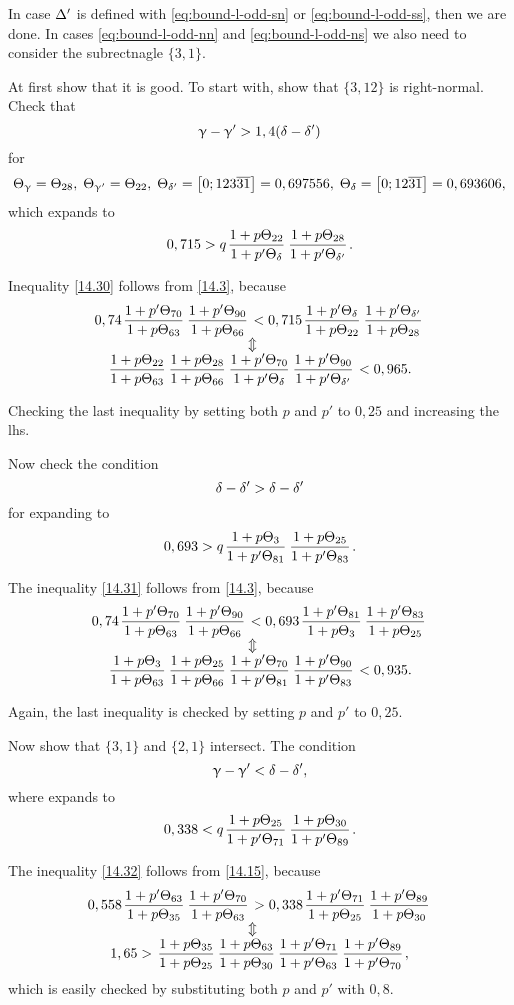 In case $\Delta'$ is defined with \ref{eq:bound-l-odd-sn} or \ref{eq:bound-l-odd-ss},
then we are done.
In cases \ref{eq:bound-l-odd-nn} and \ref{eq:bound-l-odd-ns}
we also need to consider the subrectnagle $\{3, 1\}$.

At first show that it is good.
To start with, show that $\{3, 12\}$ is right-normal.
Check that
\begin{equation*}
	\upgamma - \upgamma' > 1,4 (\delta - \delta')
\end{equation*}
for
\begin{equation*}
	\Theta_{\upgamma} = \Theta_{28},\;
	\Theta_{\upgamma'} = \Theta_{22},\;
	\Theta_{\delta'} = \left[0; 123\overline{31}\right] = 0,697556,\;
	\Theta_{\delta} = \left[0; 12\overline{31}\right] = 0,693606,
\end{equation*}
which expands to
\begin{equation}\label{14.30}
	0,715 > q \up{22}{\d} \up{28}{\d'}.
\end{equation}

Inequality \ref{14.30} follows from \ref{14.3}, because
\begin{gather*}
	0,74 \pu{70}{63} \pu{90}{66} < 0,715 \pu{\d}{22} \pu{\d'}{28}\\
	\ArrowBetweenLines
	\uu{22}{63} \uu{28}{66} \pp{70}{\d} \pp{90}{\d'} < 0,965.
\end{gather*}

Checking the last inequality by setting both $p$ and $p'$ to $0,25$ and increasing the lhs.

Now check the condition
\begin{equation*}
	\delta - \delta' > \delta - \delta'
\end{equation*}
for
expanding to
\begin{equation}\label{14.31}
	0,693 > q \up{3}{81} \up{25}{83}.
\end{equation}

The inequality \ref{14.31} follows from \ref{14.3}, because
\begin{gather*}
	0,74 \pu{70}{63} \pu{90}{66} < 0,693 \pu{81}{3} \pu{83}{25}\\
	\ArrowBetweenLines
	\uu{3}{63} \uu{25}{66} \pp{70}{81} \pp{90}{83} < 0,935.
\end{gather*}

Again, the last inequality is checked by setting $p$ and $p'$ to $0,25$.

Now show that $\{3, 1\}$ and $\{2, 1\}$ intersect.
The condition
\begin{equation*}
	\upgamma - \upgamma' < \delta - \delta',
\end{equation*}
where
expands to
\begin{equation}\label{14.32}
	0,338 < q \up{25}{71} \up{30}{89}.
\end{equation}

The inequality \ref{14.32} follows from \ref{14.15}, because
\begin{gather*}
	0,558 \pu{63}{35} \pu{70}{63} > 0,338 \pu{71}{25} \pu{89}{30}\\
	\ArrowBetweenLines
	1,65 > \uu{35}{25} \uu{63}{30} \pp{71}{63} \pp{89}{70},
\end{gather*}
which is easily checked by substituting both $p$ and $p'$ with $0,8$.